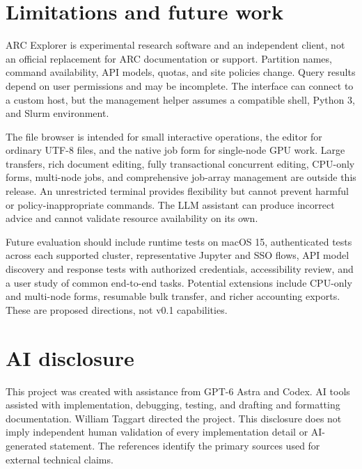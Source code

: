 \documentclass[manuscript,screen,nonacm]{acmart}
\begin{document}
\section{Limitations and future work}

ARC Explorer is experimental research software and an independent client, not an official replacement for ARC documentation or support. Partition names, command availability, API models, quotas, and site policies change. Query results depend on user permissions and may be incomplete. The interface can connect to a custom host, but the management helper assumes a compatible shell, Python 3, and Slurm environment.

The file browser is intended for small interactive operations, the editor for ordinary UTF-8 files, and the native job form for single-node GPU work. Large transfers, rich document editing, fully transactional concurrent editing, CPU-only forms, multi-node jobs, and comprehensive job-array management are outside this release. An unrestricted terminal provides flexibility but cannot prevent harmful or policy-inappropriate commands. The LLM assistant can produce incorrect advice and cannot validate resource availability on its own.

Future evaluation should include runtime tests on macOS 15, authenticated tests across each supported cluster, representative Jupyter and SSO flows, API model discovery and response tests with authorized credentials, accessibility review, and a user study of common end-to-end tasks. Potential extensions include CPU-only and multi-node forms, resumable bulk transfer, and richer accounting exports. These are proposed directions, not v0.1 capabilities.

\section{AI disclosure}

This project was created with assistance from GPT-6 Astra and Codex. AI tools assisted with implementation, debugging, testing, and drafting and formatting documentation. William Taggart directed the project. This disclosure does not imply independent human validation of every implementation detail or AI-generated statement. The references identify the primary sources used for external technical claims.



\end{document}
